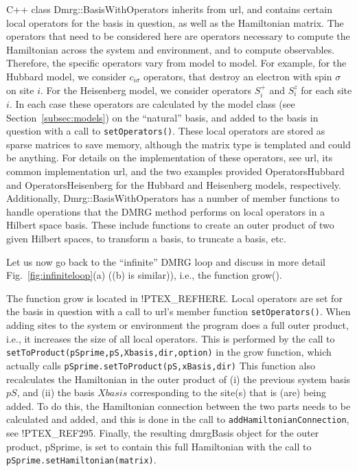 \documentclass[paper=letter]{scrartcl}
\newcommand{\cppClass}[1]{{\sffamily #1}}
\newcommand{\cppFunction}[1]{{\tt #1}}
\begin{document}
C++ class \cppClass{Dmrg::BasisWithOperators} inherits from \cppClass{url}, and contains certain local operators for the basis in question, as well as the Hamiltonian matrix. The operators that need to be considered here are operators necessary to compute the Hamiltonian across the system and environment, and to compute observables. Therefore, the specific operators vary from model to model. For example, for the Hubbard model, we consider $c_{i\sigma}$ operators, that destroy an electron with spin $\sigma$ on site $i$. For the Heisenberg model, we consider operators $S^+_i$ and $S^z_i$ for each site $i$. In each case these operators are calculated by the model class (see Section~\ref{subsec:models}) on the ``natural'' basis, and added to the basis in question with a call to \cppFunction{setOperators()}. These local operators are stored as sparse matrices to save memory, although the matrix type is templated and could be anything. For details on the implementation of these operators, see \cppClass{url}, its common implementation \cppClass{url}, and the two examples provided \cppClass{OperatorsHubbard} and \cppClass{OperatorsHeisenberg} for the Hubbard and Heisenberg models, respectively. Additionally, \cppClass{Dmrg::BasisWithOperators} has a number of member functions to handle operations that the DMRG method performs on local operators in a Hilbert space basis. These include functions to create an outer product of two given Hilbert spaces, to transform a basis, to truncate a basis, etc.

Let us now go back to the ``infinite'' DMRG loop and discuss in more detail Fig.~\ref{fig:infiniteloop}(a) ((b) is similar)), i.e., 
the function grow().

The function grow is located in !PTEX\_REF{HERE}. Local operators are set for the basis in question with a call to \cppClass{url}'s member function \cppFunction{setOperators()}. When adding sites to the system or environment the program does a full outer product, i.e., it increases the size of all local operators. This is performed by the call to \verb!setToProduct(pSprime,pS,Xbasis,dir,option)! in the grow function, which actually calls \verb!pSprime.setToProduct(pS,xBasis,dir)! This function also recalculates the Hamiltonian in the outer product of (i) the previous system basis $pS$, and (ii) the basis $Xbasis$ corresponding to the site(s) that is (are) being added. To do this, the Hamiltonian connection between the two parts needs to be calculated and added, and this is done in the call to \cppFunction{addHamiltonianConnection}, see !PTEX\_REF{295}. Finally, the resulting dmrgBasis object for the outer product, pSprime, is set to contain this full Hamiltonian with the call to \cppFunction{pSprime.setHamiltonian(matrix)}.
\end{document}
